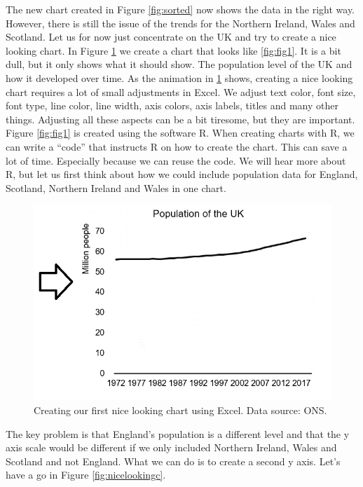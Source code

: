 \documentclass[]{book}
\begin{document}
The new chart created in Figure \ref{fig:sorted} now shows the data in the right way. However, there is still the issue of the trends for the Northern Ireland, Wales and Scotland. Let us for now just concentrate on the UK and try to create a nice looking chart. In Figure \ref{fig:nicelooking} we create a chart that looks like \ref{fig:fig1}. It is a bit dull, but it only shows what it should show. The population level of the UK and how it developed over time. As the animation in \ref{fig:nicelooking} shows, creating a nice looking chart requires a lot of small adjustments in Excel. We adjust text color, font size, font type, line color, line width, axis colors, axis labels, titles and many other things. Adjusting all these aspects can be a bit tiresome, but they are important. Figure \ref{fig:fig1} is created using the software R. When creating charts with R, we can write a ``code'' that instructs R on how to create the chart. This can save a lot of time. Especially because we can reuse the code. We will hear more about R, but let us first think about how we could include population data for England, Scotland, Northern Ireland and Wales in one chart.

\begin{figure}

{\centering \includegraphics[width=0.5\linewidth]{_resources/chapter_people/nicechart} 

}

\caption{Creating our first nice looking chart using Excel. Data source: ONS.}\label{fig:nicelooking}
\end{figure}

The key problem is that England's population is a different level and that the y axis scale would be different if we only included Northern Ireland, Wales and Scotland and not England. What we can do is to create a second y axis. Let's have a go in Figure \ref{fig:nicelookingc}.
\end{document}
